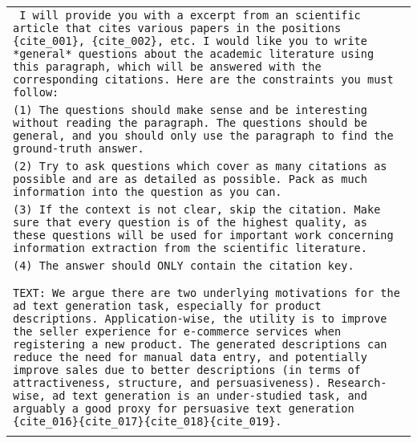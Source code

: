 \begin{table*}[ht]
    \centering
    \small
    \begin{tabular}{>{\raggedright\arraybackslash\tt}p{}<{}}
        \toprule
            \vspace{-1em}
            I will provide you with a excerpt from an scientific article that cites various papers in the positions \{cite\_001\}, \{cite\_002\}, etc. I would like you to write *general* questions about the academic literature using this paragraph, which will be answered with the corresponding citations. Here are the constraints you must follow: \\ 
            (1) The questions should make sense and be interesting without reading the paragraph. The questions should be general, and you should only use the paragraph to find the ground-truth answer. \\
            (2) Try to ask questions which cover as many citations as possible and are as detailed as possible. Pack as much information into the question as you can. \\
            (3) If the context is not clear, skip the citation. Make sure that every question is of the highest quality, as these questions will be used for important work concerning information extraction from the scientific literature. \\
            (4) The answer should ONLY contain the citation key. \\ \\ \\

            TEXT: We argue there are two underlying motivations for the ad text generation task, especially for product descriptions. Application-wise, the utility is to improve the seller experience for e-commerce services when registering a new product. The generated descriptions can reduce the need for manual data entry, and potentially improve sales due to better descriptions (in terms of attractiveness, structure, and persuasiveness). Research-wise, ad text generation is an under-studied task, and arguably a good proxy for persuasive text generation \{cite\_016\}\{cite\_017\}\{cite\_018\}\{cite\_019\}. \\ \\


\end{tabular}
\end{table*}
